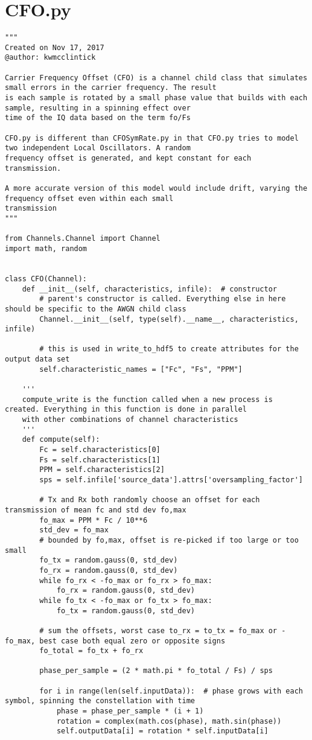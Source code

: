 \section{CFO.py}
\begin{lstlisting}[breaklines]
"""
Created on Nov 17, 2017
@author: kwmcclintick

Carrier Frequency Offset (CFO) is a channel child class that simulates small errors in the carrier frequency. The result
is each sample is rotated by a small phase value that builds with each sample, resulting in a spinning effect over
time of the IQ data based on the term fo/Fs

CFO.py is different than CFOSymRate.py in that CFO.py tries to model two independent Local Oscillators. A random
frequency offset is generated, and kept constant for each transmission.

A more accurate version of this model would include drift, varying the frequency offset even within each small
transmission
"""

from Channels.Channel import Channel
import math, random


class CFO(Channel):
    def __init__(self, characteristics, infile):  # constructor
        # parent's constructor is called. Everything else in here should be specific to the AWGN child class
        Channel.__init__(self, type(self).__name__, characteristics, infile)

        # this is used in write_to_hdf5 to create attributes for the output data set
        self.characteristic_names = ["Fc", "Fs", "PPM"]

    '''
    compute_write is the function called when a new process is created. Everything in this function is done in parallel
    with other combinations of channel characteristics
    '''
    def compute(self):
        Fc = self.characteristics[0]
        Fs = self.characteristics[1]
        PPM = self.characteristics[2]
        sps = self.infile['source_data'].attrs['oversampling_factor']

        # Tx and Rx both randomly choose an offset for each transmission of mean fc and std dev fo,max
        fo_max = PPM * Fc / 10**6
        std_dev = fo_max
        # bounded by fo,max, offset is re-picked if too large or too small
        fo_tx = random.gauss(0, std_dev)
        fo_rx = random.gauss(0, std_dev)
        while fo_rx < -fo_max or fo_rx > fo_max:
            fo_rx = random.gauss(0, std_dev)
        while fo_tx < -fo_max or fo_tx > fo_max:
            fo_tx = random.gauss(0, std_dev)

        # sum the offsets, worst case to_rx = to_tx = fo_max or -fo_max, best case both equal zero or opposite signs
        fo_total = fo_tx + fo_rx

        phase_per_sample = (2 * math.pi * fo_total / Fs) / sps

        for i in range(len(self.inputData)):  # phase grows with each symbol, spinning the constellation with time
            phase = phase_per_sample * (i + 1)
            rotation = complex(math.cos(phase), math.sin(phase))
            self.outputData[i] = rotation * self.inputData[i]
\end{lstlisting}

